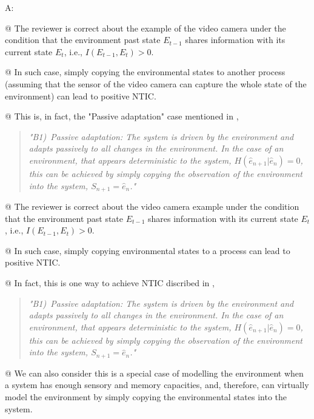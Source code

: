 \documentclass[utf8]{article}
\newenvironment{ans}  
    {\color{Black}\noindent A:}
    {~\newline}
\begin{document}
        \begin{ans}
        	
        	
        	
		    @ The reviewer is correct about the example of the video camera under the condition that the environment past state $E_{t-1}$ shares information with its current state $E_t$, i.e., $I(E_{t-1}, E_t)>0$. 
		    
		    @ In such case, simply copying the environmental states to another process (assuming that the sensor of the video camera can capture the whole state of the environment) can lead to positive NTIC. 
		    
		    @ This is, in fact, the "Passive adaptation" case mentioned in \cite[p.~4]{BERTSCHINGER.2006},	
		    \begin{quote}
			      	\textit{"B1)~Passive adaptation: The system is driven by the environment and adapts passively to all changes in the environment. In the case of an environment, that appears deterministic to the system, $H(\hat{e}_{n+1} |\hat{e}_n)=0$, this can be achieved by simply copying the observation of the environment into the system, $S_{n+1} = \hat{e}_n$."}        
		    \end{quote} 
	    
	    
	    @ The reviewer is correct about the video camera example under the condition that the environment past state $E_{t-1}$ shares information with its current state $E_t$, i.e., $I(E_{t-1}, E_t)>0$. 
	    
	    @ In such case, simply copying environmental states to a process can lead to positive NTIC. 
	    
	    @ In fact, this is one way to achieve NTIC discribed in \cite[p.~4]{BERTSCHINGER.2006},    
	    \begin{quote}
	    	\textit{"B1)~Passive adaptation: The system is driven by the environment and adapts passively to all changes in the environment. In the case of an environment, that appears deterministic to the system, $H(\hat{e}_{n+1} |\hat{e}_n)=0$, this can be achieved by simply copying the observation of the environment into the system, $S_{n+1} = \hat{e}_n$."}        
	    \end{quote} 
	    
	    @ We can also consider this is a special case of modelling the environment when a system has enough sensory and memory capacities, and, therefore, can virtually model the environment by simply copying the environmental states into the system.  


\end{ans}
\end{document}
